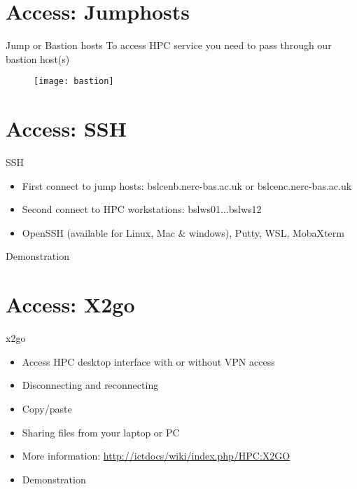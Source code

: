 {
\section{Access: Jumphosts}
%
\begin{frame}{Jump or Bastion hosts}
To access HPC service you need to pass through our bastion host(s)
\begin{figure}[h]
\texttt{[image: bastion]}
\end{figure}
\end{frame}
}

{
\section{Access: SSH}
%
\begin{frame}{SSH}
\begin{itemize}
\item First connect to jump hosts: bslcenb.nerc-bas.ac.uk or bslcenc.nerc-bas.ac.uk
\item Second connect to HPC workstations: bslws01...bslws12
\item OpenSSH (available for Linux, Mac & windows), Putty, WSL, MobaXterm
\end{itemize}
\pause
\item{{\color{red}Demonstration}}
\end{frame}
}

{
\section{Access: X2go}
%
\begin{frame}{x2go}
\begin{itemize}
\item Access HPC desktop interface with or without VPN access
\item Disconnecting and reconnecting
\item Copy/paste
\item Sharing files from your laptop or PC
\item More information: \href{http://ictdocs/wiki/index.php/HPC:X2GO}{http://ictdocs/wiki/index.php/HPC:X2GO}
\pause
\item{{\color{red}Demonstration}}
\end{itemize}
\end{frame}
}

